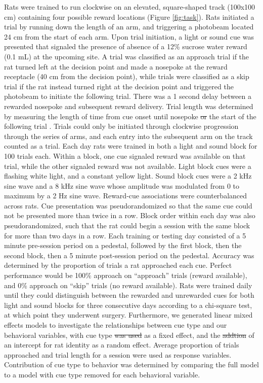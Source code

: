 \documentclass[11pt]{article}
\providecommand{\DIFadd}[1]{{\protect\color{blue}\uwave{#1}}} %
\providecommand{\DIFdel}[1]{{\protect\color{red}\sout{#1}}}                      %
\providecommand{\DIFaddbegin}{} %
\providecommand{\DIFaddend}{} %
\providecommand{\DIFdelbegin}{} %
\providecommand{\DIFdelend}{} %
\newcommand{\DIFscaledelfig}{0.5}
\newlength{\DIFdelgraphicswidth} %
\newlength{\DIFdelgraphicsheight} %
\newcommand{\DIFaddincludegraphics}[2][]{{\color{blue}\fbox{\DIFOincludegraphics[#1]{#2}}}} %
\newcommand{\DIFdelincludegraphics}[2][]{%
\sbox{\DIFdelgraphicsbox}{\DIFOincludegraphics[#1]{#2}}%
\settoboxwidth{\DIFdelgraphicswidth}{\DIFdelgraphicsbox} %
\settoboxtotalheight{\DIFdelgraphicsheight}{\DIFdelgraphicsbox} %
\scalebox{\DIFscaledelfig}{%
\parbox[b]{\DIFdelgraphicswidth}{\usebox{\DIFdelgraphicsbox}\\[-\baselineskip] \rule{\DIFdelgraphicswidth}{0em}}\llap{\resizebox{\DIFdelgraphicswidth}{\DIFdelgraphicsheight}{%
\setlength{\unitlength}{\DIFdelgraphicswidth}%
\begin{picture}(1,1)%
\thicklines\linethickness{2pt} %
{\color[rgb]{1,0,0}\put(0,0){\framebox(1,1){}}}%
{\color[rgb]{1,0,0}\put(0,0){\line( 1,1){1}}}%
{\color[rgb]{1,0,0}\put(0,1){\line(1,-1){1}}}%
\end{picture}%
}\hspace*{3pt}}} %
} %
\DeclareRobustCommand{\DIFaddbegin}{\DIFOaddbegin \let\includegraphics\DIFaddincludegraphics} %
\DeclareRobustCommand{\DIFaddend}{\DIFOaddend \let\includegraphics\DIFOincludegraphics} %
\DeclareRobustCommand{\DIFdelbegin}{\DIFOdelbegin \let\includegraphics\DIFdelincludegraphics} %
\DeclareRobustCommand{\DIFdelend}{\DIFOaddend \let\includegraphics\DIFOincludegraphics} %
\begin{document}
Rats were trained to run clockwise on an elevated, square-shaped track (100x100 cm) containing four possible reward locations (Figure \ref{fig:task}). Rats initiated a trial by running down the length of an arm, and triggering a photobeam located 24 cm from the start of each arm. Upon trial initiation, a light or sound cue was presented that signaled the presence of absence of a 12\% sucrose water reward (0.1 mL) at the upcoming site. A trial was classified as an approach trial if the rat turned left at the decision point and made a nosepoke at the reward receptacle (40 cm from the decision point), while trials were classified as a skip trial if the rat instead turned right at the decision point and triggered the photobeam to initiate the following trial. There was a 1 second delay between a rewarded nosepoke and subsequent reward delivery. Trial length was determined by measuring the length of time from cue onset until nosepoke \DIFdelbegin \DIFdel{or }\DIFdelend \DIFaddbegin \DIFadd{(for approach trials), or from cue onset until }\DIFaddend the start of the following trial \DIFaddbegin \DIFadd{(for skip trials)}\DIFaddend . Trials could only be initiated through clockwise progression through the series of arms, and each entry into the subsequent arm on the track counted as a trial. Each day rats were trained in both a light and sound block for 100 trials each. Within a block, one cue signaled reward was available on that trial, while the other signaled reward was not available. Light block cues were a flashing white light, and a constant yellow light. Sound block cues were a 2 kHz sine wave and a 8 kHz sine wave whose amplitude was modulated from 0 to maximum by a 2 Hz sine wave. Reward-cue associations were counterbalanced across rats. Cue presentation was pseudorandomized so that the same cue could not be presented more than twice in a row. Block order within each day was also pseudorandomized, such that the rat could begin a session with the same block for more than two days in a row. Each training or testing day consisted of a 5 minute pre-session period on a pedestal, followed by the first block, then the second block, then a 5 minute post-session period on the pedestal. Accuracy was determined by the proportion of trials a rat approached each cue. Perfect performance would be 100\% approach on “approach” trials (reward available), and 0\% approach on “skip” trials (no reward available). Rats were trained daily until they could distinguish between the rewarded and unrewarded cues for both light and sound blocks for three consecutive days according to a chi-square test, at which point they underwent surgery. Furthermore, we generated linear mixed effects models to investigate the relationships between cue type and our behavioral variables, with cue type \DIFdelbegin \DIFdel{was used }\DIFdelend as a fixed effect, and the \DIFdelbegin \DIFdel{addtion }\DIFdelend \DIFaddbegin \DIFadd{addition }\DIFaddend of an intercept for rat identity as a random effect. Average proportion of trials approached and trial length for a session were used as response variables. Contribution of cue type to behavior was determined by comparing the full model to a model with cue type removed for each behavioral variable. 
\end{document}
